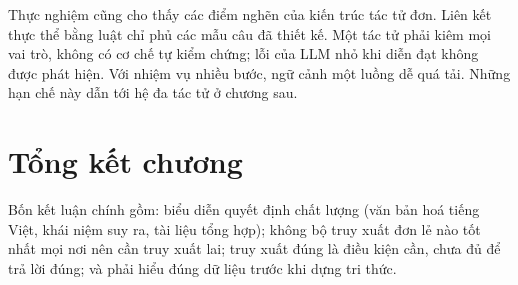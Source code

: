 
Thực nghiệm cũng cho thấy các điểm nghẽn của kiến trúc tác tử đơn. Liên kết thực thể bằng luật chỉ phủ các mẫu câu đã thiết kế. Một tác tử phải kiêm mọi vai trò, không có cơ chế tự kiểm chứng; lỗi của LLM nhỏ khi diễn đạt không được phát hiện. Với nhiệm vụ nhiều bước, ngữ cảnh một luồng dễ quá tải. Những hạn chế này dẫn tới hệ đa tác tử ở chương sau.

\section{Tổng kết chương}
Bốn kết luận chính gồm: biểu diễn quyết định chất lượng (văn bản hoá tiếng Việt, khái niệm suy ra, tài liệu tổng hợp); không bộ truy xuất đơn lẻ nào tốt nhất mọi nơi nên cần truy xuất lai; truy xuất đúng là điều kiện cần, chưa đủ để trả lời đúng; và phải hiểu đúng dữ liệu trước khi dựng tri thức.
